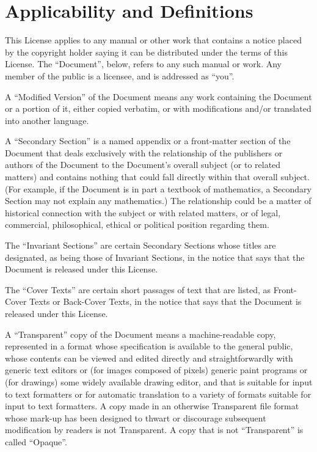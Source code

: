	\section{Applicability and Definitions}

	This License applies to any manual or other work that contains a
	notice placed by the copyright holder saying it can be distributed
	under the terms of this License.  The ``Document'', below, refers to any
	such manual or work.  Any member of the public is a licensee, and is
	addressed as ``you''.

	A ``Modified Version'' of the Document means any work containing the
	Document or a portion of it, either copied verbatim, or with
	modifications and/or translated into another language.

	A ``Secondary Section'' is a named appendix or a front-matter section of
	the Document that deals exclusively with the relationship of the
	publishers or authors of the Document to the Document's overall subject
	(or to related matters) and contains nothing that could fall directly
	within that overall subject.  (For example, if the Document is in part a
	textbook of mathematics, a Secondary Section may not explain any
	mathematics.)  The relationship could be a matter of historical
	connection with the subject or with related matters, or of legal,
	commercial, philosophical, ethical or political position regarding
	them.

	The ``Invariant Sections'' are certain Secondary Sections whose titles
	are designated, as being those of Invariant Sections, in the notice
	that says that the Document is released under this License.

	The ``Cover Texts'' are certain short passages of text that are listed,
	as Front-Cover Texts or Back-Cover Texts, in the notice that says that
	the Document is released under this License.

	A ``Transparent'' copy of the Document means a machine-readable copy,
	represented in a format whose specification is available to the
	general public, whose contents can be viewed and edited directly and
	straightforwardly with generic text editors or (for images composed of
	pixels) generic paint programs or (for drawings) some widely available
	drawing editor, and that is suitable for input to text formatters or
	for automatic translation to a variety of formats suitable for input
	to text formatters.  A copy made in an otherwise Transparent file
	format whose mark-up has been designed to thwart or discourage
	subsequent modification by readers is not Transparent.  A copy that is
	not ``Transparent'' is called ``Opaque''.

